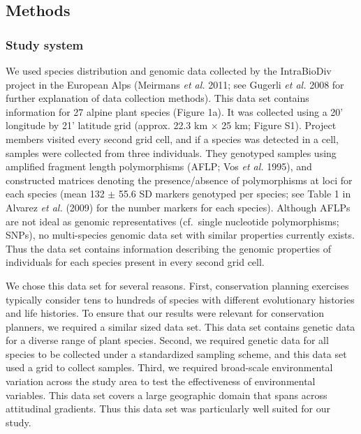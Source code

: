 \documentclass[11pt,]{article}
\begin{document}
\subsection{Methods}\label{methods}

\subsubsection{Study system}\label{study-system}

We used species distribution and genomic data collected by the
IntraBioDiv project in the European Alps (Meirmans \emph{et al.} 2011;
see Gugerli \emph{et al.} 2008 for further explanation of data
collection methods). This data set contains information for 27 alpine
plant species (Figure 1a). It was collected using a 20' longitude by 21'
latitude grid (approx. 22.3 km \(\times\) 25 km; Figure S1). Project
members visited every second grid cell, and if a species was detected in
a cell, samples were collected from three individuals. They genotyped
samples using amplified fragment length polymorphisms (AFLP; Vos
\emph{et al.} 1995), and constructed matrices denoting the
presence/absence of polymorphisms at loci for each species (mean 132
\(\pm\) 55.6 SD markers genotyped per species; see Table 1 in Alvarez
\emph{et al.} (2009) for the number markers for each species). Although
AFLPs are not ideal as genomic representatives (cf.~single nucleotide
polymorphisms; SNPs), no multi-species genomic data set with similar
properties currently exists. Thus the data set contains information
describing the genomic properties of individuals for each species
present in every second grid cell.

We chose this data set for several reasons. First, conservation planning
exercises typically consider tens to hundreds of species with different
evolutionary histories and life histories. To ensure that our results
were relevant for conservation planners, we required a similar sized
data set. This data set contains genetic data for a diverse range of
plant species. Second, we required genetic data for all species to be
collected under a standardized sampling scheme, and this data set used a
grid to collect samples. Third, we required broad-scale environmental
variation across the study area to test the effectiveness of
environmental variables. This data set covers a large geographic domain
that spans across attitudinal gradients. Thus this data set was
particularly well suited for our study.
\end{document}

